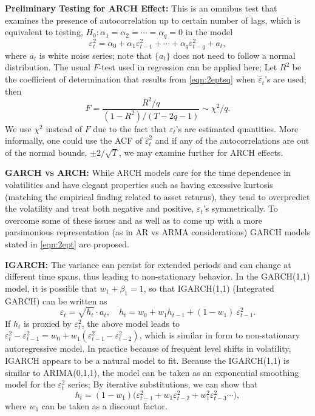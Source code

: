 \noindent\textbf{Preliminary Testing for ARCH Effect:} This is an omnibus test that examines the presence of autocorrelation up to certain number of lags, which is equivalent to testing, $H_0: \alpha_1 = \alpha_2= \cdots = \alpha_q = 0$ in the model
	\begin{equation} \label{eqn:2eptsq}
	\varepsilon_t^2 = \alpha_0 + \alpha_1 \varepsilon_{t-1}^2 + \cdots + \alpha_q \varepsilon_{t-q}^2 + a_t,
	\end{equation}
where $a_t$ is white noise series; note that $\{ a_t \}$ does not need to follow a normal distribution. The usual $F$-test used in regression can be applied here; Let $R^2$ be the coefficient of determination that results from \eqref{eqn:2eptsq} when $\hat{\varepsilon}_t$'s are used; then
	\begin{equation} \label{eqn:2F}
	F = \frac{R^2/q}{(1 - R^2)/(T - 2q - 1)} \sim \chi^2/q.
	\end{equation}
We use $\chi^2$ instead of $F$ due to the fact that $\varepsilon_t$'s are estimated quantities. More informally, one could use the ACF of $\hat{\varepsilon}_t^2$ and if any of the autocorrelations are out of the normal bounds, $\pm 2/\sqrt{T}$, we may examine further for ARCH effects. \twomedskip


\noindent\textbf{GARCH vs ARCH:} While ARCH models care for the time dependence in volatilities and have elegant properties such as having excessive kurtosis (matching the empirical finding related to asset returns), they tend to overpredict the volatility and treat both negative and positive, $\varepsilon_t$'s symmetrically. To overcome some of these issues and as well as to come up with a more parsimonious representation (as in AR vs ARMA considerations) GARCH models stated in \eqref{eqn:2ept} are proposed. \twomedskip


\noindent\textbf{IGARCH:} The variance can persist for extended periods and can change at different time spans, thus leading to non-stationary behavior. In the GARCH(1,1) model, it is possible that $w_1 + \beta_1 = 1$, so that IGARCH(1,1) (Integrated GARCH) can be written as
	\begin{equation} \label{eqn:2eptsqrt}
	\varepsilon_t = \sqrt{h_t} \cdot a_t, \quad h_t = w_0 + w_1h_{t-1} + (1 - w_1)\ \varepsilon_{t-1}^2.
	\end{equation}
If $h_t$ is proxied by $\varepsilon_t^2$, the above model leads to $\varepsilon_t^2 - \varepsilon_{t-1}^2 = w_0 + w_1(\varepsilon_{t-1}^2 - \varepsilon_{t-2}^2)$, which is similar in form to non-stationary autoregressive model. In practice because of frequent level shifts in volatility, IGARCH appears to be a natural model to fit. Because the IGARCH(1,1) is similar to ARIMA(0,1,1), the model can be taken as an exponential smoothing model for the $\varepsilon_t^2$ series; By iterative substitutions, we can show that
	\begin{equation} \label{eqn:2ht1w}
	h_t = (1 - w_1) \big( \varepsilon_{t-1}^2 + w_1 \varepsilon_{t-2}^2 + w_1^2 \varepsilon_{t-3}^2 \cdots \big),
	\end{equation}
where $w_1$ can be taken as a discount factor. \twomedskip


